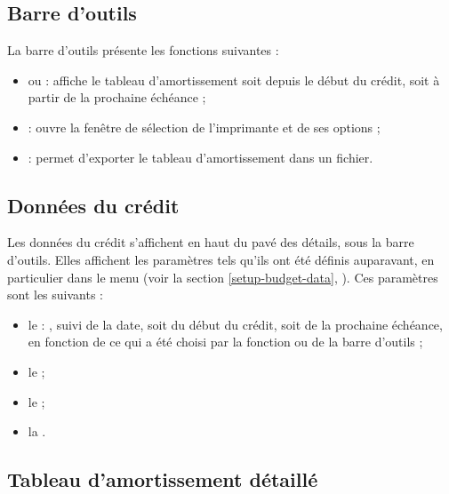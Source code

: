 \ifIllustration
\newpage
\fi


\subsection{Barre d'outils\label{budget-amortization-functions}}

La barre d'outils présente les fonctions suivantes  : 

\begin{itemize}
	 \item {} ou  : affiche le tableau d'amortissement soit depuis le début du crédit, soit à partir de la prochaine échéance ;
	 \item {} : ouvre la fenêtre de sélection de l'imprimante et de ses options ;
	 \item {} : permet d'exporter le tableau d'amortissement dans un fichier.
\end{itemize}


\subsection{Données du crédit\label{budget-amortization-data}}

Les données du crédit s'affichent en haut du pavé des détails, sous la barre d'outils. Elles affichent les paramètres tels qu'ils ont été définis auparavant, en particulier dans le menu  (voir la section \vref{setup-budget-data}, ). Ces paramètres sont les suivants :

\begin{itemize}
	 \item le  : , suivi de la date, soit du début du crédit, soit de la prochaine échéance, en fonction de ce qui a été choisi par la fonction  ou  de la barre d'outils ;
	 \item le  ; 
	 \item le  ;
	 \item la .
\end{itemize}


\subsection{Tableau d'amortissement détaillé\label{budget-amortization-table}}

